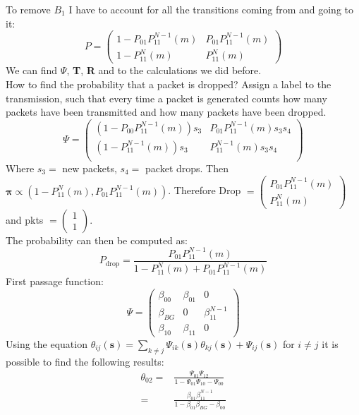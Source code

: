 To remove $B_1$ I have to account for all the transitions coming from and going to it: \\
$$P =
\begin{pmatrix}
		1-P_{01}P_{11}^{N-1}(m) & P_{01}P_{11}^{N-1}(m) \\
		1-P_{11}^N(m) & P_{11}^N(m)
\end{pmatrix}$$
We can find $\Psi$, \textbf{T}, \textbf{R} and to the calculations we did before. \\
How to find the probability that a packet is dropped?
Assign a label to the transmission, such that every time a packet is generated counts how many packets have been transmitted and how many packets have been dropped.
$$\Psi=
\begin{pmatrix}
	 (1- P_{00}P_{11}^{N-1}(m))s_3 & P_{01}P_{11}^{N-1}(m)s_3s_4 \\
	 (1- P_{11}^{N-1}(m))s_3 & P_{11}^{N-1}(m)s_3s_4 \\
\end{pmatrix} $$
Where $s_3 =$ new packets, $s_4 =$ packet drops. Then $\mathbf{\pi} \propto (1-P_{11}^N(m),P_{01}P_{11}^{N-1}(m))$.
Therefore Drop $= \begin{pmatrix} P_{01}P_{11}^{N-1}(m) \\ P_{11}^N(m) \end{pmatrix}$ and pkts $= \begin{pmatrix} 1 \\ 1 \end{pmatrix}$.\\
The probability can then be computed as:
\begin{equation}
	P_{\text{drop}} = \frac{P_{01}P_{11}^{N-1}(m)}{1-P_{11}^N(m) + P_{01}P_{11}^{N-1}(m)}
\end{equation}
First passage function:
$$\Psi=
\begin{pmatrix}
	 \beta_{00} & \beta_{01} & 0 \\
	 \beta_{BG} & 0 & \beta_{11}^{N-1} \\
	 \beta_{10} & \beta_{11} & 0
\end{pmatrix} $$
Using the equation $\theta_{ij}(\textbf{s}) = \sum_{k \neq j} \Psi_{ik}(\textbf{s})\theta_{kj}(\textbf{s}) + \Psi_{ij}(\textbf{s})$ for $i\neq j$ it is possible to find the following results:
\begin{equation*}
	\begin{split}
		\theta_{02} = & \frac{\Psi_{01}\Psi_{12}}{1 - \Psi_{01}\Psi_{10} - \Psi_{00}}\\
		= & \frac{\beta_{01}\beta_{11}^{N-1}}{1- \beta_{01}\beta_{BG}-\beta_{00}}
	\end{split}
\end{equation*}

